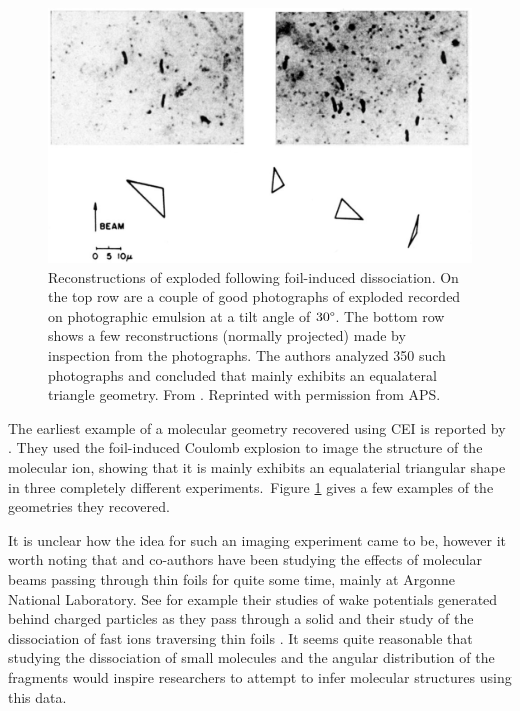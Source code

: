 \begin{figure}[H]
  \centering
  \includegraphics[width=\textwidth]{gfx/HydrogenTrimerReconstruction}
  \caption[Reconstructions of exploded  following foil-induced dissociation.]
  {Reconstructions of exploded  following foil-induced dissociation. On the top row are a couple of good photographs of exploded  recorded on photographic emulsion at a tilt angle of $30\degree$. The bottom row shows a few reconstructions (normally projected) made by inspection from the photographs. The authors analyzed 350 such photographs and concluded that  mainly exhibits an equalateral triangle geometry. From \citet{Gaillard78}. Reprinted with permission from APS.}
  \label{fig:hydrogenTrimer}
\end{figure}

The earliest example of a molecular geometry recovered using CEI is reported by \citet{Gaillard78}. They used the foil-induced Coulomb explosion to image the structure of the  molecular ion, showing that it is mainly exhibits an equalaterial triangular shape in three completely different experiments.\footnotemark ~Figure \ref{fig:hydrogenTrimer} gives a few examples of the geometries they recovered.


It is unclear how the idea for such an imaging experiment came to be, however it worth noting that \citet{Gaillard78} and co-authors have been studying the effects of molecular beams passing through thin foils for quite some time, mainly at Argonne National Laboratory. See for example their studies of wake potentials generated behind charged particles as they pass through a solid \citep{Gemmell75, Vager76PRL} and their study of the dissociation of fast  ions traversing thin foils \citep{Vager76PRA}. It seems quite reasonable that studying the dissociation of small molecules and the angular distribution of the fragments would inspire researchers to attempt to infer molecular structures using this data.

